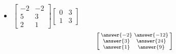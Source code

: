 \documentclass{ximera}
\begin{document}
\begin{exercise}
\begin{itemize}
\[        \]
        \item
        $\begin{bmatrix}
            -2 & -2 \\
            5 & 3 \\
            2 & 1
        \end{bmatrix}
        \begin{bmatrix}
            0 & 3 \\
            1 & 3
        \end{bmatrix}$
        \[
            \left[\begin{smallmatrix} \answer{-2} & \answer{-12} \\ \answer{3} & \answer{24} \\ \answer{1} & \answer{9} \end{smallmatrix}\right]
        \]
    \end{itemize}
\end{exercise}
\end{document}
